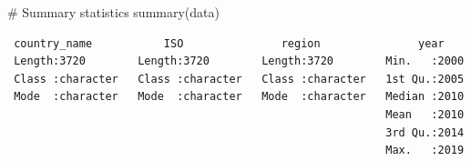 \documentclass[
  letterpaper,
  DIV=11,
  numbers=noendperiod]{scrartcl}
\newenvironment{Shaded}{\begin{snugshade}}{\end{snugshade}}
\newcommand{\CommentTok}[1]{\textcolor[rgb]{0.37,0.37,0.37}{#1}}
\newcommand{\FunctionTok}[1]{\textcolor[rgb]{0.28,0.35,0.67}{#1}}
\newcommand{\NormalTok}[1]{\textcolor[rgb]{0.00,0.23,0.31}{#1}}
\begin{document}
\begin{Shaded}
\begin{Highlighting}[]
\CommentTok{\# Summary statistics}
\FunctionTok{summary}\NormalTok{(data)}
\end{Highlighting}
\end{Shaded}

\begin{verbatim}
 country_name           ISO               region               year     
 Length:3720        Length:3720        Length:3720        Min.   :2000  
 Class :character   Class :character   Class :character   1st Qu.:2005  
 Mode  :character   Mode  :character   Mode  :character   Median :2010  
                                                          Mean   :2010  
                                                          3rd Qu.:2014  
                                                          Max.   :2019  
                                                                        

\end{verbatim}
\end{document}

